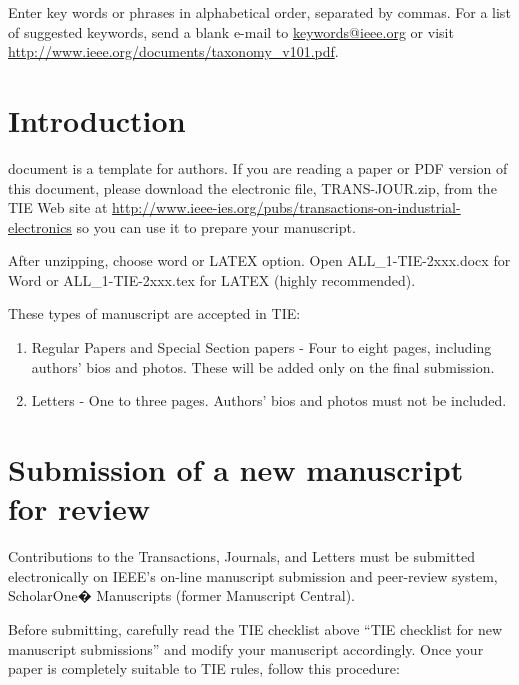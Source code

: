 \documentclass[journal]{IEEEtranTIE}
\begin{document}
\begin{IEEEkeywords}
Enter key words or phrases in alphabetical order, separated by commas. For a list of suggested keywords, send a blank e-mail to \href{mailto:keywords@ieee.org}{keywords@ieee.org} or visit \url{http://www.ieee.org/documents/taxonomy_v101.pdf}.
\end{IEEEkeywords}

%
{}


\section{Introduction}

 document is a template for authors. If you are reading a paper or PDF version of this document, please download the electronic file, TRANS-JOUR.zip, from the TIE Web site at \url{http://www.ieee-ies.org/pubs/transactions-on-industrial-electronics} so you can use it to prepare your manuscript.

After unzipping, choose word or LATEX option. Open ALL\_1-TIE-2xxx.docx for Word or ALL\_1-TIE-2xxx.tex for LATEX (highly recommended).

These types of manuscript are accepted in TIE:


\begin{enumerate}[1)]
	\item Regular Papers and Special Section papers - Four to eight pages, including authors' bios and photos. These will be added only on the final submission.
	\item Letters - One to three pages. Authors' bios and photos must not be included.
\end{enumerate}


\section{Submission of a new manuscript for review}

Contributions to the Transactions, Journals, and Letters must be submitted electronically on IEEE's on-line manuscript submission and peer-review system, ScholarOne� Manuscripts (former Manuscript Central).

Before submitting, carefully read the TIE checklist above ``TIE checklist for new manuscript submissions'' and modify your manuscript accordingly. Once your paper is completely suitable to TIE rules, follow this procedure:
\end{document}
